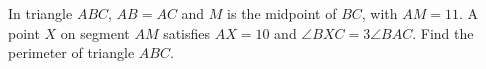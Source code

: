 In triangle $ABC$, $AB=AC$ and $M$ is the midpoint of $BC$, with $AM=11$. A point $X$ on segment $AM$ satisfies $AX=10$ and $\angle BXC=3\angle BAC$. Find the perimeter of triangle $ABC$.
